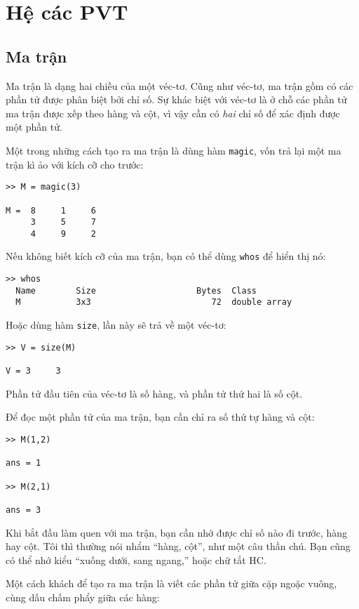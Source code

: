\documentclass[12pt]{book}
\begin{document}
\chapter{Hệ các PVT}

\section{Ma trận}

Ma trận là dạng hai chiều của một véc-tơ. Cũng như véc-tơ, ma trận
gồm có các phần tử được phân biệt bởi chỉ số. Sự khác biệt với
véc-tơ là ở chỗ các phần tử ma trận được xếp theo hàng và cột, 
vì vậy cần có {\em hai} chỉ số để xác định được một phần tử.

Một trong những cách tạo ra ma trận là dùng hàm {\tt magic},
vốn trả lại một ma trận kì ảo với kích cỡ cho trước:

\begin{verbatim}
>> M = magic(3)

M =  8     1     6
     3     5     7
     4     9     2
\end{verbatim}
%
Nếu không biết kích cỡ của ma trận, bạn có thể dùng {\tt whos} 
để hiển thị nó:

\begin{verbatim}
>> whos
  Name        Size                    Bytes  Class
  M           3x3                        72  double array
\end{verbatim}
%
Hoặc dùng hàm {\tt size}, lần này sẽ trả về một véc-tơ:

\begin{verbatim}
>> V = size(M)

V = 3     3
\end{verbatim}
%
Phần tử đầu tiên của véc-tơ là số hàng, và phần tử thứ hai là số cột.

Để đọc một phần tử của ma trận, bạn cần chỉ ra số thứ tự hàng và cột:

\begin{verbatim}
>> M(1,2)

ans = 1

>> M(2,1)

ans = 3
\end{verbatim}
%
Khi bắt đầu làm quen với ma trận, bạn cần nhớ được chỉ số nào
đi trước, hàng hay cột. Tôi thì thường nói nhẩm ``hàng, cột'',
như một câu thần chú. Bạn cũng có thể nhớ kiểu 
``xuống dưới, sang ngang,'' hoặc chữ tắt HC.

Một cách khách để tạo ra ma trận là viết các phần tử giữa cặp
ngoặc vuông, cùng dấu chấm phẩy giữa các hàng:
\end{document}
